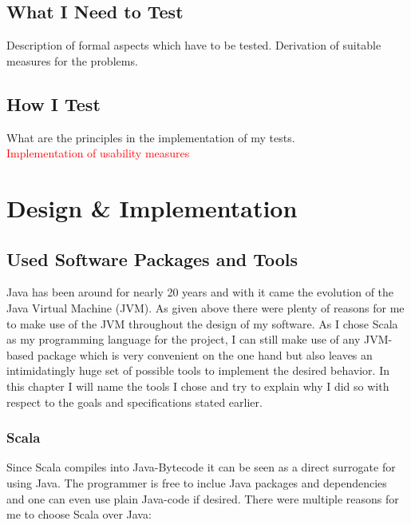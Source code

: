 \documentclass[11p]{scrartcl}
\begin{document}
\subsection{What I Need to Test}
Description of formal aspects which have to be tested. Derivation of suitable measures for the problems.
\subsection{How I Test}
What are the principles in the implementation of my tests.\\
\textcolor{red}{Implementation of usability measures}
 

\section{Design \& Implementation}
\label{sec:implementation}
\subsection{Used Software Packages and Tools}
\label{sec:softwarePackages}
Java has been around for nearly 20 years \cite{link:javaRelease1} and with it came the evolution of the Java Virtual Machine (JVM). As given above there were plenty of reasons for me to make use of the JVM throughout the design of my software.
As I chose Scala as my programming language for the project, I can still make use of any JVM-based package which is very convenient on the one hand but also leaves an intimidatingly huge set of possible tools to implement the desired behavior. In this chapter I will name the tools I chose and try to explain why I did so with respect to the goals and specifications stated earlier.

\subsubsection{Scala} %
Since Scala compiles into Java-Bytecode it can be seen as a direct surrogate for using Java. The programmer is free to inclue Java packages and dependencies and one can even use plain Java-code if desired. There were multiple reasons for me to choose Scala over Java:\\
\end{document}
